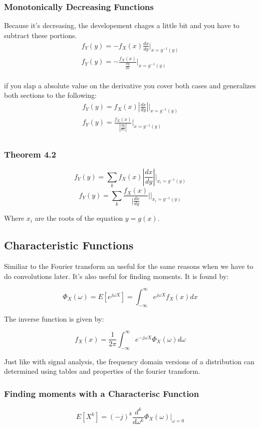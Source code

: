 \documentclass[12pt]{article}
\begin{document}
\subsubsection{Monotonically Decreasing Functions}
Because it's decreasing, the developement chages a little bit
and you have to subtract these portions.
\begin{align}
  f_Y(y) = -f_X(x)\frac{dx}{dy}\big|_{x=g^{-1}(y)} \\
  f_Y(y) = -\frac{f_X(x)}{\frac{dy}{dx}}\big|_{x=g^{-1}(y)} \\
\end{align}

if you slap a absolute value on the derivative you cover both cases
and generalizes both sections to the following:
\begin{align}
  f_Y(y) = f_X(x)|\frac{dx}{dy}|\big|_{x=g^{-1}(y)} \\
  f_Y(y) = \frac{f_X(x)}{|\frac{dy}{dx}|}\big|_{x=g^{-1}(y)} \\
\end{align}

\subsubsection{Theorem 4.2}
\[f_Y(y) = \sum_k f_X(x)|\frac{dx}{dy}|\big|_{x_i = g^{-1}(y)}\]
\[f_Y(y) = \sum_k \frac{f_X(x)}{|\frac{dx}{dy}}|\big|_{x_i = g^{-1}(y)}\]

Where $x_i$ are the roots of the equation $y= g(x)$.

\subsection{Characteristic Functions}
Similiar to the Fourier transform an useful for the same reasons
when we have to do convolutions later. It's also useful for finding
moments. It is found by:

\[\Phi_X(\omega) = E[e^{j\omega X}] = \int_{-\infty}^{\infty} e^{j\omega X}f_X(x) dx\]

The inverse function is given by:

\[f_X(x) = \frac{1}{2\pi}\int_{-\infty}^{\infty} e^{-j\omega X}\Phi_X(\omega) d\omega\]

Just like with signal analysis, the frequency domain versions
of a distribution can determined using tables and properties of the
fourier transform.

\subsubsection{Finding moments with a Characterisc Function}
\[E[X^k] = (-j)^k \frac{d^k}{d\omega^k}\Phi_X(\omega)\big|_{\omega = 0}\]
\end{document}
